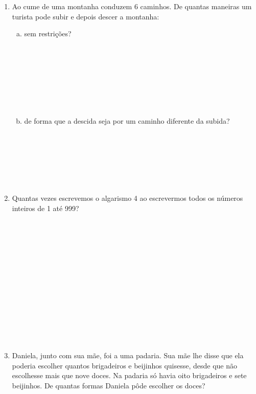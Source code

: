 \documentclass[a4paper,14pt]{article}
\begin{document}
\begin{multicols}{2}
\begin{enumerate}
\begin{enumerate}[a)]
			\end{enumerate}
		    \item Ao cume de uma montanha conduzem 6 caminhos. De quantas maneiras um turista pode subir e depois descer a montanha:
		    \begin{enumerate}[a)]
		    	\item sem restrições? \\\\\\\\\\\\\\\\
		    	\item de forma que a descida seja por um caminho diferente da subida? \\\\\\\\\\\\\\
		    \end{enumerate}
	        \item Quantas vezes escrevemos o algarismo 4 ao escrevermos todos os números inteiros de 1 até 999? \\\\\\\\\\\\\\\\\\\\\\\\\\\\
	        \item Daniela, junto com sua mãe, foi a uma padaria. Sua mãe lhe disse que ela poderia escolher quantos brigadeiros e beijinhos quisesse, desde que não escolhesse mais que nove doces. Na padaria só havia oito brigadeiros e sete beijinhos. De quantas formas Daniela pôde escolher os doces? \\\\\\\\\\\\\\\\\\\\\\\\\\\\

\end{enumerate}
\end{multicols}
\end{document}
